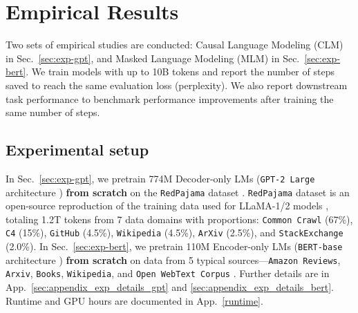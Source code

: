 \documentclass{article} %
\newcommand{\call}[1]{\textbf{\textcolor{orange}{[Call: #1]}}}
\begin{document}

\vspace{-0.5em}
\section{Empirical Results}\vspace{-0.5em}
Two sets of empirical studies are conducted: Causal Language Modeling (CLM) in Sec.~\ref{sec:exp-gpt}, and Masked Language Modeling (MLM) in Sec.~\ref{sec:exp-bert}. We train models with up to 10B tokens and report the number of steps saved to reach the same evaluation loss (perplexity). We also report downstream task performance to benchmark performance improvements after training the same number of steps.



\subsection{Experimental setup}




In Sec.~\ref{sec:exp-gpt}, we pretrain 774M Decoder-only LMs (\texttt{GPT-2 Large} architecture \citep{radford2019language}) \textbf{from scratch} on the \texttt{RedPajama} dataset \citep{together2023redpajama}. \texttt{RedPajama} dataset is an open-source reproduction of the training data used for LLaMA-1/2 models \citep{touvron2023llama}, totaling 1.2T tokens from 7 data domains with proportions: \texttt{Common Crawl} (67\%), \texttt{C4} \citep{raffel2020exploring} (15\%), \texttt{GitHub} (4.5\%), \texttt{Wikipedia} (4.5\%), \texttt{ArXiv} (2.5\%), and \texttt{StackExchange} (2.0\%). 
In Sec.~\ref{sec:exp-bert}, we pretrain 110M Encoder-only LMs (\texttt{BERT-base} architecture \citep{DBLP:journals/corr/abs-1810-04805}) \textbf{from scratch} on data from 5 typical sources—\texttt{Amazon Reviews}, \texttt{Arxiv}, \texttt{Books}, \texttt{Wikipedia}, and \texttt{Open WebText Corpus} \citep{Gokaslan2019OpenWeb}. Further details are in App.~\ref{sec:appendix_exp_details_gpt} and \ref{sec:appendix_exp_details_bert}. Runtime and GPU hours are documented in App.~\ref{runtime}.
\end{document}
